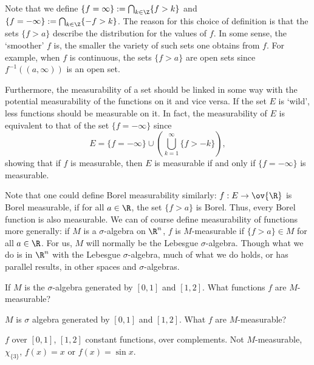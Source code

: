 Note that we define $\{ f=\infty\}:= \bigcap_{k \in \Z} \{ f>k \}$ and $\{ f= -\infty\}:= \bigcap_{k \in \Z} \{ -f>k\}$. The reason for this choice of definition is that the sets $\{f > a\}$ describe the distribution for the values of $f$. In some sense, the `smoother' $f$ is, the smaller the variety of such sets one obtains from $f$. For example, when $f$ is continuous, the sets $\{f>a\}$ are open sets since $f^{-1}((a,\infty))$ is an open set. 


Furthermore, the measurability of a set should be linked in some way with the potential measurability of the functions on it and vice versa. If the set $E$ is `wild', less functions should be measurable on it. In fact, the measurability of $E$ is equivalent to that of the set $\{ f= -\infty\}$ since
	\[
	E= \{ f= -\infty\} \cup \left( \bigcup_{k=1}^\infty \{f > -k\} \right),
	\]
showing that if $f$ is measurable, then $E$ is measurable if and only if $\{ f= -\infty\}$ is measurable. 


Note that one could define Borel measurability similarly: $f: E \to \ov{\R}$ is Borel measurable, if for all $a \in \R$, the set $\{ f>a\}$ is Borel. Thus, every Borel function is also measurable. We can of course define measurability of functions more generally: if $M$ is a $\sigma$-algebra on $\R^n$, $f$ is $M$-measurable if $\{f>a\} \in M$ for all $a \in \R$. For us, $M$ will normally be the Lebesgue $\sigma$-algebra. Though what we do is in $\R^n$ with the Lebesgue $\sigma$-algebra, much of what we do holds, or has parallel results, in other spaces and $\sigma$-algebras. 





























\begin{ex}
If $M$ is the $\sigma$-algebra generated by $[0,1]$ and $[1,2]$. What functions $f$ are $M$-measurable?

$M$ is $\sigma$ algebra generated by $[0,1]$ and $[1,2]$. What $f$ are $M$-measurable?

$f$ over $[0,1]$, $[1,2]$ constant functions, over complements. Not $M$-measurable, $\chi_{\{3\}}$, $f(x)=x$ or $f(x)= \sin x$. 

\end{ex}


